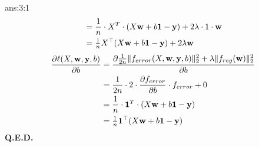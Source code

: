 \documentclass{tron}
\begin{document}
\begin{answer}{ans:3:1}
\begin{align}
			&= \frac{1}{n} \cdot X^T \cdot (X \mathbf{w}+ b\mathbf{1} - \mathbf{y}) + 2 \lambda \cdot 1 \cdot \mathbf{w} \\
			&= \tfrac1n X^\top (X\mathbf{w} + b\mathbf{1} - \mathbf{y}) + 2 \lambda \mathbf{w}
	\end{align}
	\begin{align}
		\frac{\partial \ell(X, \mathbf{w}, \mathbf{y}, b)}{\partial b} 
			&= \frac{\partial \frac{1}{2n} \| f_{error}(X, \mathbf{w}, \mathbf{y}, b)\|_2^2 + \lambda \| f_{reg}(\mathbf{w}) \|_2^2
}{\partial b} \\
			&=  \frac{1}{2n} \cdot 2 \cdot \frac{\partial f_{error}}{\partial b} \cdot f_{error} +  0\\
			&= \frac{1}{n} \cdot \mathbf{1}^T \cdot (X \mathbf{w}+ b\mathbf{1} - \mathbf{y}) \\
			&= \tfrac1n \mathbf{1}^\top (X\mathbf{w} + b\mathbf{1} - \mathbf{y})
	\end{align}
\textbf{Q.E.D.}
\end{answer}
\end{document}
